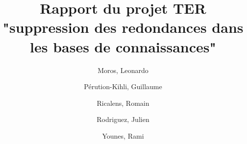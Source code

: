 \documentclass{article}
\title{Rapport du projet TER "suppression des redondances dans les bases de connaissances"}
\author{
  Moros, Leonardo\\
  \and
  Pérution-Kihli, Guillaume\\
  \and
  Ricalens, Romain\\
  \and
  Rodriguez, Julien\\
  \and
  Younes, Rami\\}
\begin{document}
\maketitle
\newpage
\renewcommand{\contentsname}{Sommaire}
\tableofcontents
\newpage


\newpage

\newpage

\newpage

\newpage

\newpage

\newpage

\newpage

\newpage


\newpage


\end{document}
